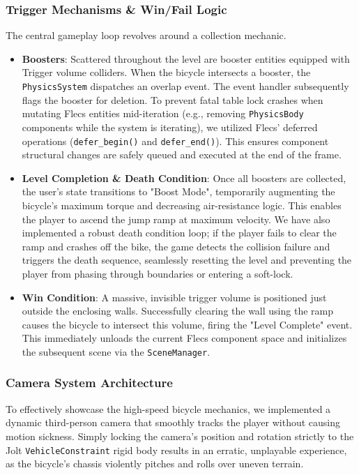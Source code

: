 \documentclass[acmtog, nonacm]{acmart}
\begin{document}
\subsubsection{Trigger Mechanisms \& Win/Fail Logic}
The central gameplay loop revolves around a collection mechanic.
\begin{itemize}
    \item \textbf{Boosters}: Scattered throughout the level are booster entities equipped with Trigger volume colliders. When the bicycle intersects a booster, the \texttt{PhysicsSystem} dispatches an overlap event. The event handler subsequently flags the booster for deletion. To prevent fatal table lock crashes when mutating Flecs entities mid-iteration (e.g., removing \texttt{PhysicsBody} components while the system is iterating), we utilized Flecs' deferred operations (\texttt{defer\_begin()} and \texttt{defer\_end()}). This ensures component structural changes are safely queued and executed at the end of the frame.
    \item \textbf{Level Completion \& Death Condition}: Once all boosters are collected, the user's state transitions to "Boost Mode", temporarily augmenting the bicycle's maximum torque and decreasing air-resistance logic. This enables the player to ascend the jump ramp at maximum velocity. We have also implemented a robust death condition loop; if the player fails to clear the ramp and crashes off the bike, the game detects the collision failure and triggers the death sequence, seamlessly resetting the level and preventing the player from phasing through boundaries or entering a soft-lock.
    \item \textbf{Win Condition}: A massive, invisible trigger volume is positioned just outside the enclosing walls. Successfully clearing the wall using the ramp causes the bicycle to intersect this volume, firing the "Level Complete" event. This immediately unloads the current Flecs component space and initializes the subsequent scene via the \texttt{SceneManager}.
\end{itemize}

\subsubsection{Camera System Architecture}
To effectively showcase the high-speed bicycle mechanics, we implemented a dynamic third-person camera that smoothly tracks the player without causing motion sickness. Simply locking the camera's position and rotation strictly to the Jolt \texttt{VehicleConstraint} rigid body results in an erratic, unplayable experience, as the bicycle's chassis violently pitches and rolls over uneven terrain.
\end{document}
